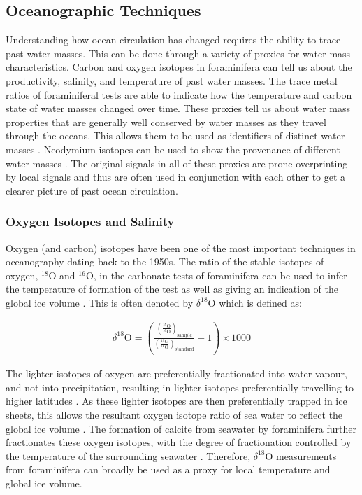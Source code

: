 \subsection{Oceanographic Techniques}

Understanding how ocean circulation has changed requires the ability to trace past water masses. This can be done through a variety of proxies for water mass characteristics. Carbon and oxygen isotopes in foraminifera can tell us about the productivity, salinity, and temperature of past water masses. The trace metal ratios of foraminiferal tests are able to indicate how the temperature and carbon state of water masses changed over time. These proxies tell us about water mass properties that are generally well conserved by water masses as they travel through the oceans. This allows them to be used as identifiers of distinct water masses \citep{kimOriginTsushimaCurrent2005, raeDeepWaterFormation2014, woodardAntarcticRoleNorthern2014}. Neodymium isotopes can be used to show the provenance of different water masses \citep{amakawaNeodymiumIsotopicVariations2004}. The original signals in all of these proxies are prone overprinting by local signals and thus are often used in conjunction with each other to get a clearer picture of past ocean circulation.

\subsubsection{Oxygen Isotopes and Salinity}
\label{sec:oxygen}

Oxygen (and carbon) isotopes have been one of the most important techniques in oceanography dating back to the 1950s. The ratio of the stable isotopes of oxygen, $^{18}$O and $^{16}$O, in the carbonate tests of foraminifera can be used to infer the temperature of formation of the test as well as giving an indication of the global ice volume \citep{crissPrinciplesStableIsotope1999}. This is often denoted by $\delta^{18}\text{O}$ which is defined as:

\begin{align}
\delta^{18}\text{O}=\left(\frac {\left(\frac {^{18}\text{O}}{^{16}\text{O}}\right)_{\text{sample}} }{\left({\frac {^{18}O}{^{16}\text{O}}}\right)_{\text{standard}}}-1\right)\times 1000
\end{align}

The lighter isotopes of oxygen are preferentially fractionated into water vapour, and not into precipitation, resulting in lighter isotopes preferentially travelling to higher latitudes \citep{raveloChapterEighteenUse2007}. As these lighter isotopes are then preferentially trapped in ice sheets, this allows the resultant oxygen isotope ratio of sea water to reflect the global ice volume \citep{shackletonOxygenIsotopesIce1987}. The formation of calcite from seawater by foraminifera further fractionates these oxygen isotopes, with the degree of fractionation controlled by the temperature of the surrounding seawater \citep{raveloChapterEighteenUse2007}. Therefore, $\delta^{18}$O measurements from foraminifera can broadly be used as a proxy for local temperature and global ice volume. 

